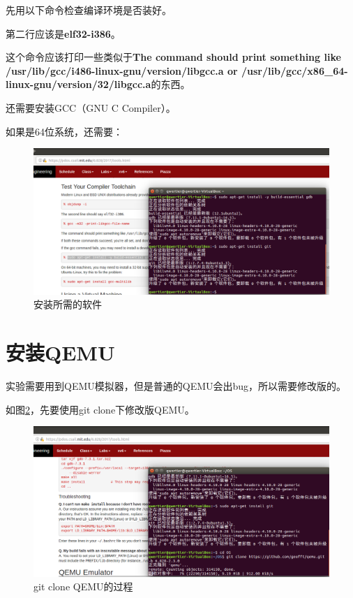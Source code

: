 \documentclass[forprint]{WHUBachelor}
\begin{document}
先用以下命令检查编译环境是否装好。


第二行应该是\textbf{elf32-i386}。


这个命令应该打印一些类似于\textbf{The command should print something like /usr/lib/gcc/i486-linux-gnu/version/libgcc.a or /usr/lib/gcc/x86\_64-linux-gnu/version/32/libgcc.a}的东西。

还需要安装GCC（GNU C Compiler）。


如果是64位系统，还需要：


\begin{figure}[H]
  \centering
  \includegraphics[width=6in]{figures/prep/tools.png}
  \caption{安装所需的软件}\label{fig:prep:tools}
\end{figure}

\section{安装QEMU}

实验需要用到QEMU模拟器，但是普通的QEMU会出bug，所以需要修改版的。

如图\ref{fig:prep:qemu}，先要使用git clone下修改版QEMU。


\begin{figure}[H]
  \centering
  \includegraphics[width=6in]{figures/prep/qemu.png}
  \caption{git clone QEMU的过程}\label{fig:prep:qemu}
\end{figure}
\end{document}

